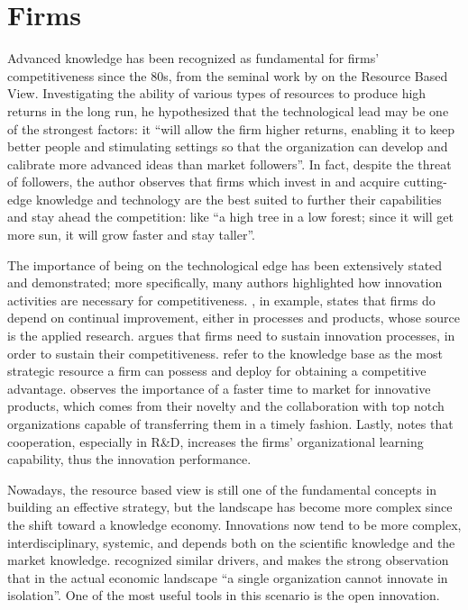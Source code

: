 

\label{Chapter3} %

\section{Firms}

Advanced knowledge has been recognized as fundamental for firms' competitiveness since the 80s, from the seminal work by \citet{Wernerfelt1984} on the Resource Based View. Investigating the ability of various types of resources to produce high returns in the long run, he hypothesized that the technological lead may be one of the strongest factors: it \enquote{will allow the firm higher returns, enabling it to keep better people and stimulating settings so that the organization can develop and calibrate more advanced ideas than market followers}. In fact, despite the threat of followers, the author observes that firms which invest in and acquire cutting-edge knowledge and technology are the best suited to further their capabilities and stay ahead the competition: like \enquote{a high tree in a low forest; since it will get more sun, it will grow faster and stay taller}.

The importance of being on the technological edge has been extensively stated and demonstrated; more specifically, many authors highlighted how innovation activities are necessary for competitiveness. \citet{Beath2000}, in example, states that firms do depend on continual improvement, either in processes and products, whose source is the applied research. \citet{Yusuf2008} argues that firms need to sustain innovation processes, in order to sustain their competitiveness. \citet{Jimenez2011} refer to the knowledge base as the most strategic resource a firm can possess and deploy for obtaining a competitive advantage. \citet{Siegel2003a} observes the importance of a faster time to market for innovative products, which comes from their novelty and the collaboration with top notch organizations capable of transferring them in a timely fashion. Lastly, \citet{AzagraCaro2010} notes that cooperation, especially in R\&D, increases the firms' organizational learning capability, thus the innovation performance. 

Nowadays, the resource based view is still one of the fundamental concepts in building an effective strategy, but the landscape has become more complex since the shift toward a knowledge economy. Innovations now tend to be more complex, interdisciplinary, systemic, and depends both on the scientific knowledge and the market knowledge. \citet{Dahlander2010} recognized similar drivers, and makes the strong observation that in the actual economic landscape \enquote{a single organization cannot innovate in isolation}. One of the most useful tools in this scenario is the open innovation.

